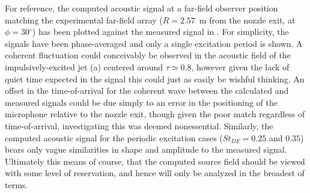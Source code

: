 For reference, the computed acoustic signal at a far-field observer position matching the experimental far-field array ($R = 2.57$~m from the nozzle exit, at $\phi = 30^\circ$) has been plotted against the measured signal in .
For simplicity, the signals have been phase-averaged and only a single excitation period is shown.
A coherent fluctuation could conceivably be observed in the acoustic field of the impulsively-excited jet (a) centered around $\tau \simeq 0.8$, however given the lack of quiet time expected in the signal this could just as easily be wishful thinking.
An offset in the time-of-arrival for the coherent wave between the calculated and measured signals could be due simply to an error in the positioning of the microphone relative to the nozzle exit, though given the poor match regardless of time-of-arrival, investigating this was deemed nonessential.
Similarly, the computed acoustic signal for the periodic excitation cases ($St_{DF} = 0.25$ and $0.35$) bears only vague similarities in shape and amplitude to the measured signal.
Ultimately this means of course, that the computed source field should be viewed with some level of reservation, and hence will only be analyzed in the broadest of terms.
